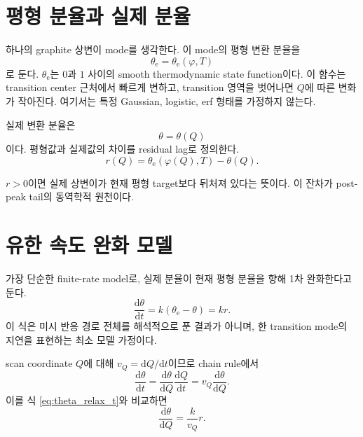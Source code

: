 \documentclass[11pt]{article}
\newcommand{\dd}{\mathrm{d}}
\begin{document}
\section{평형 분율과 실제 분율}

하나의 graphite 상변이 mode를 생각한다. 이 mode의 평형 변환 분율을
\begin{equation}
\theta_{\mathrm e}=\theta_{\mathrm e}(\varphi,T)
\label{eq:theta_eq_def}
\end{equation}
로 둔다. \(\theta_{\mathrm e}\)는 \(0\)과 \(1\) 사이의 smooth thermodynamic state function이다. 이 함수는 transition center 근처에서 빠르게 변하고, transition 영역을 벗어나면 \(Q\)에 따른 변화가 작아진다. 여기서는 특정 Gaussian, logistic, erf 형태를 가정하지 않는다.

실제 변환 분율은
\begin{equation}
\theta=\theta(Q)
\label{eq:theta_actual}
\end{equation}
이다. 평형값과 실제값의 차이를 residual lag로 정의한다.
\begin{equation}
r(Q)=\theta_{\mathrm e}(\varphi(Q),T)-\theta(Q).
\label{eq:residual_def}
\end{equation}

\(r>0\)이면 실제 상변이가 현재 평형 target보다 뒤처져 있다는 뜻이다. 이 잔차가 post-peak tail의 동역학적 원천이다.

\section{유한 속도 완화 모델}

가장 단순한 finite-rate model로, 실제 분율이 현재 평형 분율을 향해 1차 완화한다고 둔다.
\begin{equation}
\frac{\dd\theta}{\dd t}
=
k\left(\theta_{\mathrm e}-\theta\right)
=
k r .
\label{eq:theta_relax_t}
\end{equation}
이 식은 미시 반응 경로 전체를 해석적으로 푼 결과가 아니며, 한 transition mode의 지연을 표현하는 최소 모델 가정이다.

scan coordinate \(Q\)에 대해 \(v_Q=\dd Q/\dd t\)이므로 chain rule에서
\begin{equation}
\frac{\dd\theta}{\dd t}
=
\frac{\dd\theta}{\dd Q}
\frac{\dd Q}{\dd t}
=
v_Q\frac{\dd\theta}{\dd Q}.
\end{equation}
이를 식 \eqref{eq:theta_relax_t}와 비교하면
\begin{equation}
\boxed{
\frac{\dd\theta}{\dd Q}
=
\frac{k}{v_Q}r .
}
\label{eq:theta_relax_Q}
\end{equation}
\end{document}
